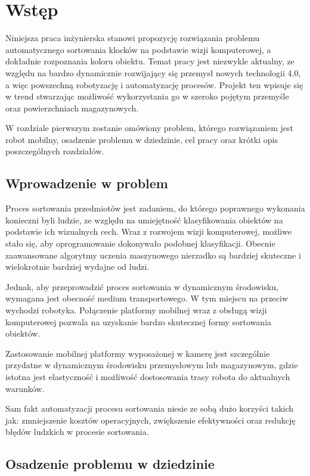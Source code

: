 \chapter{Wstęp}
\label{ch:wstep}

Niniejsza praca inżynierska stanowi propozycję rozwiązania problemu automatycznego sortowania klocków na podstawie wizji komputerowej, a dokładnie rozpoznania koloru obiektu. Temat pracy jest niezwykle aktualny, ze względu na bardzo dynamicznie rozwijający się przemysł nowych technologii 4.0, a więc powszechną robotyzację i automatyzację procesów. Projekt ten wpisuje się w trend stwarzając możliwość wykorzystania go w szeroko pojętym przemyśle oraz powierzchniach magazynowych. 

W rozdziale pierwszym zostanie omówiony problem, którego rozwiązaniem jest robot mobilny, osadzenie problemu w dziedzinie, cel pracy oraz krótki opis poszczególnych rozdziałów. 

\section{Wprowadzenie w problem}
\label{sec:wprowadzenie}

Proces sortowania przedmiotów jest zadaniem, do którego poprawnego wykonania konieczni byli ludzie, ze względu na umiejętność klasyfikowania obiektów na podstawie ich wizualnych cech. Wraz z rozwojem wizji komputerowej, możliwe stało się, aby oprogramowanie dokonywało podobnej klasyfikacji. Obecnie zaawansowane algorytmy uczenia maszynowego nierzadko są bardziej skuteczne i wielokrotnie bardziej wydajne od ludzi. 

Jednak, aby przeprowadzić proces sortowania w dynamicznym środowisku, wymagana jest obecność medium transportowego. W tym miejscu na przeciw wychodzi robotyka. Połączenie platformy mobilnej wraz z obsługą wizji komputerowej pozwala na uzyskanie bardzo skutecznej formy sortowania obiektów. 

Zastosowanie mobilnej platformy wyposażonej w kamerę jest szczególnie przydatne w dynamicznym środowisku przemysłowym lub magazynowym, gdzie istotna jest elastyczność i możliwość dostosowania trasy robota do aktualnych warunków. 

Sam fakt automatyzacji procesu sortowania niesie ze sobą dużo korzyści takich jak: zmniejszenie kosztów operacyjnych, zwiększenie efektywności oraz redukcję błędów ludzkich w procesie sortowania.  

\section{Osadzenie problemu w dziedzinie}
\label{sec:osadzenie}

